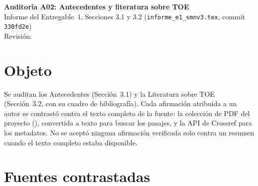 \newcommand{\auditoriaid}{A02 -- Antecedentes y literatura TOE}



\begin{center}
{\Large\bfseries Auditoría A02: Antecedentes y literatura sobre TOE}\\[0.4em]
{\normalsize Informe del Entregable~1, Secciones 3.1 y 3.2 (\texttt{informe\_e1\_smnv3.tex}, commit \texttt{330fd2e})}\\[0.2em]
{\small Revisión: \fechaentrega}
\end{center}

\section{Objeto}

Se auditan los Antecedentes (Sección~3.1) y la Literatura sobre TOE (Sección~3.2, con su cuadro de bibliografía). Cada afirmación atribuida a un autor se contrastó contra el texto completo de la fuente: la colección de PDF del proyecto (), convertida a texto para buscar los pasajes, y la API de Crossref para los metadatos. No se aceptó ninguna afirmación verificada solo contra un resumen cuando el texto completo estaba disponible.

\section{Fuentes contrastadas}

